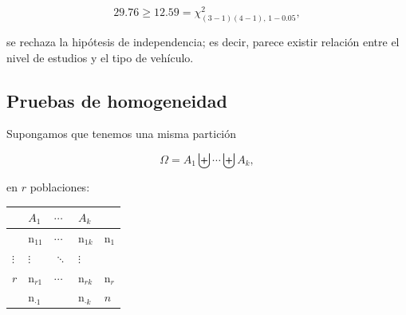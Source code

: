 \documentclass[
]{article}
\begin{document}
\[
29.76 \ge 12.59=\chi^{2}_{(3-1)(4-1),\,1-0.05},
\]

se rechaza la hipótesis de independencia; es decir, parece existir relación entre el nivel de estudios y el tipo de vehículo.

\subsection{Pruebas de homogeneidad}\label{pruebas-de-homogeneidad}

Supongamos que tenemos una misma partición

\[
\Omega=A_{1} \biguplus \cdots \biguplus A_{k},
\]

en \(r\) poblaciones:

\begin{longtable}[]{@{}
  >{\raggedright\arraybackslash}p{}
  >{\raggedright\arraybackslash}p{}
  >{\raggedright\arraybackslash}p{}
  >{\raggedright\arraybackslash}p{}
  >{\raggedright\arraybackslash}p{}@{}}
\toprule\noalign{}
\begin{minipage}[b]{\linewidth}\raggedright
\end{minipage} & \begin{minipage}[b]{\linewidth}\raggedright
\(A_{1}\)
\end{minipage} & \begin{minipage}[b]{\linewidth}\raggedright
\(\cdots\)
\end{minipage} & \begin{minipage}[b]{\linewidth}\raggedright
\(A_{k}\)
\end{minipage} & \begin{minipage}[b]{\linewidth}\raggedright
\end{minipage} \\
\midrule\noalign{}
\endhead
\bottomrule\noalign{}
\endlastfoot
1 & \(\mathrm{n}_{11}\) & \(\cdots\) & \(\mathrm{n}_{1k}\) & \(\mathrm{n}_{1}\) \\
\(\vdots\) & \(\vdots\) & \(\ddots\) & \(\vdots\) & \\
\(r\) & \(\mathrm{n}_{r1}\) & \(\cdots\) & \(\mathrm{n}_{rk}\) & \(\mathrm{n}_{r}\) \\
& \(\mathrm{n}_{\cdot 1}\) & & \(\mathrm{n}_{\cdot k}\) & \(n\) \\
\end{longtable}
\end{document}
